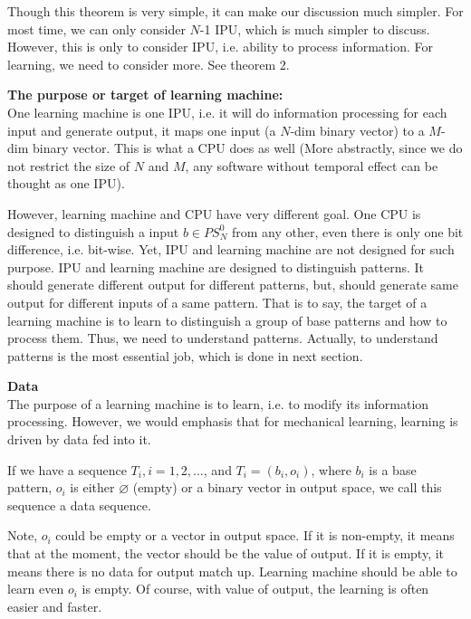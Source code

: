 Though this theorem is very simple, it can make our discussion much simpler. For most time, we can only consider $N$-1 IPU, which is much simpler to discuss. However, this is only to consider IPU, i.e. ability to process information. For learning, we need to consider more. See theorem 2. 
\bigskip



{\bf The purpose or target of learning machine:} \\
One learning machine is one IPU, i.e. it will do information processing for each input and
generate output, it maps one input (a $N$-dim binary vector) to a $M$-dim binary vector. This is what a CPU does as well (More abstractly, since we do not restrict the size of $N$ and $M$, any software without temporal effect can be thought as one IPU). 

However, learning machine and CPU have very different goal. One CPU is designed to distinguish a
input $b \in PS^0_N$ from any other, even there is only one bit difference, i.e. bit-wise. Yet, IPU and learning machine are not designed for such purpose. IPU and learning machine are designed to distinguish patterns. It should generate different output for different patterns, but, should generate same output for different inputs of a same pattern. That is to say, the target of a learning machine is to learn to distinguish a group of base patterns and how to process them. Thus, we need to understand patterns. Actually, to understand patterns is the most essential job, which is done in next section. 
\bigskip


{\bf Data } \\
The purpose of a learning machine is to learn, i.e. to modify its information processing. However, we would emphasis that for mechanical learning, learning is driven by data fed into it.


\begin{definition}
If we have a sequence $T_i, i=1, 2, \ldots$, and $T_i = (b_i, o_i)$, where $b_i$ is a base pattern, $o_i$ is either $\varnothing$ (empty) or a binary vector in output space, we call this sequence a data sequence. 
\end{definition}
Note, $o_i$ could be empty or a vector in output space. If it is non-empty, it means that at the moment, the vector should be the value of output. If it is empty, it means there is no data for output match up. Learning machine should be able to learn even $o_i$ is empty. Of course, with value of output, the learning is often easier and faster.  

